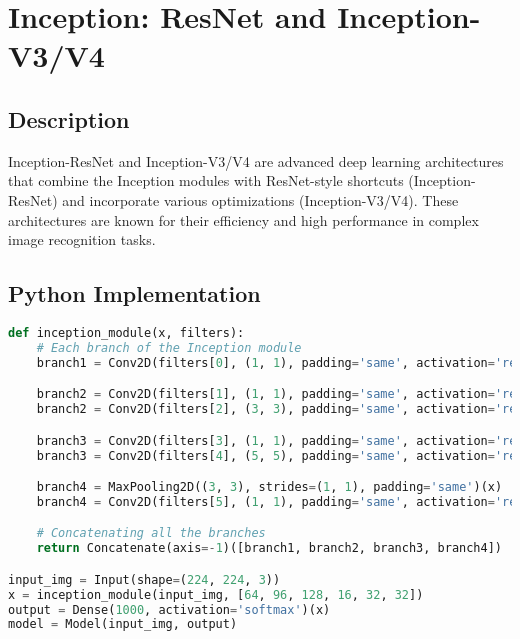 \chapter{Inception: ResNet and Inception-V3/V4}

\section{Description}
Inception-ResNet and Inception-V3/V4 are advanced deep learning architectures that combine the Inception modules with ResNet-style shortcuts (Inception-ResNet) and incorporate various optimizations (Inception-V3/V4). These architectures are known for their efficiency and high performance in complex image recognition tasks.

\section{Python Implementation}
\begin{lstlisting}[language=Python]
def inception_module(x, filters):
    # Each branch of the Inception module
    branch1 = Conv2D(filters[0], (1, 1), padding='same', activation='relu')(x)

    branch2 = Conv2D(filters[1], (1, 1), padding='same', activation='relu')(x)
    branch2 = Conv2D(filters[2], (3, 3), padding='same', activation='relu')(branch2)

    branch3 = Conv2D(filters[3], (1, 1), padding='same', activation='relu')(x)
    branch3 = Conv2D(filters[4], (5, 5), padding='same', activation='relu')(branch3)

    branch4 = MaxPooling2D((3, 3), strides=(1, 1), padding='same')(x)
    branch4 = Conv2D(filters[5], (1, 1), padding='same', activation='relu')(branch4)

    # Concatenating all the branches
    return Concatenate(axis=-1)([branch1, branch2, branch3, branch4])

input_img = Input(shape=(224, 224, 3))
x = inception_module(input_img, [64, 96, 128, 16, 32, 32])
output = Dense(1000, activation='softmax')(x)
model = Model(input_img, output)
\end{lstlisting}

